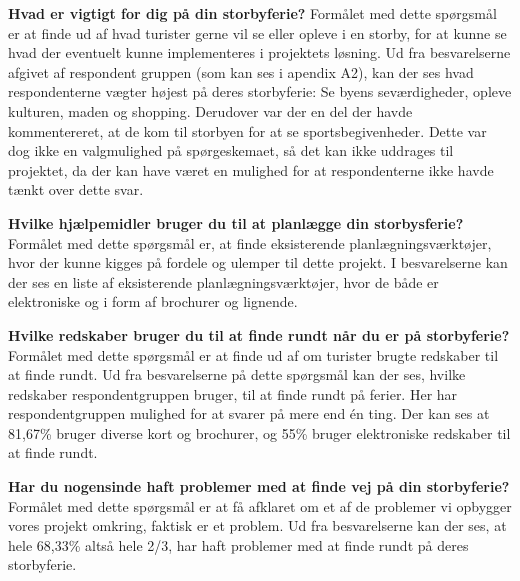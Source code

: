 \textbf{Hvad er vigtigt for dig på din storbyferie?}\newline
Formålet med dette spørgsmål er at finde ud af hvad turister gerne vil se eller opleve i en storby, for at kunne se hvad der eventuelt kunne implementeres i projektets løsning.\newline
Ud fra besvarelserne afgivet af respondent gruppen (som kan ses i apendix A2), kan der ses hvad respondenterne vægter højest på deres storbyferie: Se byens seværdigheder, opleve kulturen, maden og shopping. Derudover var der en del der havde kommentereret, at de kom til storbyen for at se sportsbegivenheder. Dette var dog ikke en valgmulighed på spørgeskemaet, så det kan ikke uddrages til projektet, da der kan have været en mulighed for at respondenterne ikke havde tænkt over dette svar.\newline

\textbf{Hvilke hjælpemidler bruger du til at planlægge din storbysferie?}\newline
Formålet med dette spørgsmål er, at finde eksisterende planlægningsværktøjer, hvor der kunne kigges på fordele og ulemper til dette projekt.\newline 
I besvarelserne kan der ses en liste af eksisterende planlægningsværktøjer, hvor de både er elektroniske og i form af brochurer og lignende.\newline
 
\textbf{Hvilke redskaber bruger du til at finde rundt når du er på storbyferie?}\newline
Formålet med dette spørgsmål er at finde ud af om turister brugte redskaber til at finde rundt.\newline 
Ud fra besvarelserne på dette spørgsmål kan der ses, hvilke redskaber respondentgruppen bruger, til at finde rundt på ferier. Her har respondentgruppen mulighed for at svarer på mere end én ting. Der kan ses at 81,67\% bruger diverse kort og brochurer, og 55\% bruger elektroniske redskaber til at finde rundt. \newline

\textbf{Har du nogensinde haft problemer med at finde vej på din storbyferie?}\newline
Formålet med dette spørgsmål er at få afklaret om et af de problemer vi opbygger vores projekt omkring, faktisk er et problem.\newline
Ud fra besvarelserne kan der ses, at hele 68,33\% altså hele 2/3, har haft problemer med at finde rundt på deres storbyferie.\newline

